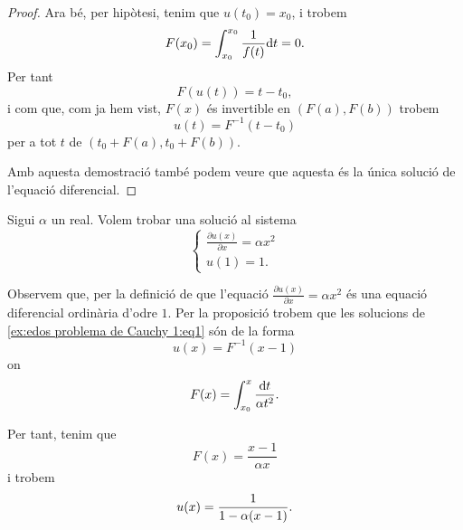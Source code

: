 \documentclass[../Apunts.tex]{subfiles}
\begin{document}
\begin{proposition}
\begin{proof}
			Ara bé, per hipòtesi, tenim que \(u(t_{0})=x_{0}\), i trobem
			\[F(x_{0})=\int_{x_{0}}^{x_{0}}\frac{1}{f(t)}\textrm{d} t=0.\]
			Per tant
			\[F(u(t))=t-t_{0},\]
			i com que, com ja hem vist, \(F(x)\) és invertible en \((F(a),F(b))\) trobem
			\[u(t)=F^{-1}(t-t_{0})\]
			per a tot \(t\) de \((t_{0}+F(a), t_{0}+F(b))\).
			
			Amb aquesta demostració també podem veure que aquesta és la única solució de l'equació diferencial.
		\end{proof}
	\end{proposition}
	\begin{example}
		\label{ex:edos problema de Cauchy 1}
		Sigui \(\alpha\) un real. Volem trobar una solució al sistema
		\begin{equation}
			\label{ex:edos problema de Cauchy 1:eq1}
			\begin{cases*}
				\frac{\partial u(x)}{\partial x}=\alpha x^{2} \\
				u(1)=1.
			\end{cases*}
		\end{equation}
		\begin{solution}
			Observem que, per la definició de  que l'equació \(\frac{\partial u(x)}{\partial x}=\alpha x^{2}\) és una equació diferencial ordinària d'odre \(1\). Per la proposició  trobem que les solucions de \eqref{ex:edos problema de Cauchy 1:eq1} són de la forma
			\[u(x)=F^{-1}(x-1)\]
			on
			\[F(x)=\int_{x_{0}}^{x}\frac{\textrm{d} t}{\alpha t^{2}}.\]
			
			Per tant, tenim que
			\[F(x)=\frac{x-1}{\alpha x}\]
			i trobem
			\[u(x)=\frac{1}{1-\alpha (x-1)}.\qedhere\]
		\end{solution}
	\end{example}
\end{document}

